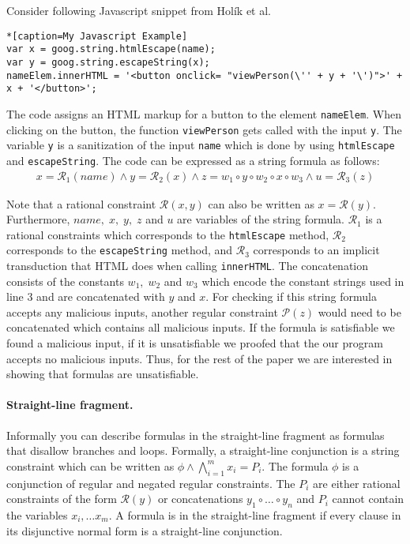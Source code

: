\begin{example}\label{example:pre}
Consider following Javascript snippet from Hol\'{i}k et al. ~\cite{??}
\begin{lstlisting}*[caption=My Javascript Example]
var x = goog.string.htmlEscape(name);
var y = goog.string.escapeString(x);
nameElem.innerHTML = '<button onclick= "viewPerson(\'' + y + '\')">' + x + '</button>';
\end{lstlisting}

The code assigns an HTML markup for a button to the element \texttt{nameElem}.
When clicking on the button, the function \texttt{viewPerson} gets called with the input \texttt{y}. The variable \texttt{y} is a sanitization of the input \texttt{name} which is done by using \texttt{htmlEscape} and \texttt{escapeString}.
The code can be expressed as a string formula as follows:
\begin{align*}
x = \mathcal{R}_1(name) \wedge y = \mathcal{R}_2(x) \wedge z = w_1 \circ y \circ w_2 \circ x \circ w_3 \wedge u = \mathcal{R}_3(z)
\end{align*}

Note that a rational constraint $\mathcal{R}(x,y)$ can also be written as $x = \mathcal{R}(y)$. 
Furthermore, $name,\;x,\; y,\; z$ and $u$ are variables of the string formula. 
$\mathcal{R}_1$ is a rational constraints which corresponds to the \texttt{htmlEscape} method, $\mathcal{R}_2$ corresponds to the \texttt{escapeString} method, and $\mathcal{R}_3$ corresponds to an implicit transduction that HTML does when calling \texttt{innerHTML}.
The concatenation consists of the constants $w_1, \; w_2$ and $w_3$ which encode the constant strings used in line 3 and are concatenated with $y$ and $x$.
For checking if this string formula accepts any malicious inputs, another regular constraint $\mathcal{P}(z)$ would need to be concatenated which contains all malicious inputs.
If the formula is satisfiable we found a malicious input, if it is unsatisfiable we proofed that the our program accepts no malicious inputs.
Thus, for the rest of the paper we are interested in showing that formulas are unsatisfiable.

\end{example} 

\paragraph*{Straight-line fragment.} Informally you can describe formulas in the straight-line fragment as formulas that disallow branches and loops. 
Formally, a straight-line conjunction is a string constraint which can be written as $\phi \wedge \bigwedge^m_{i=1} x_i = P_i$.
The formula $\phi$ is a conjunction of regular and negated regular constraints.
The $P_i$ are either rational constraints of the form $\mathcal{R}(y)$ or concatenations $y_1 \circ \dots \circ y_n$ and  $P_i$ cannot contain the variables $x_i,\dots x_m$.
A formula is in the straight-line fragment if every clause in its disjunctive normal form is a straight-line conjunction.

